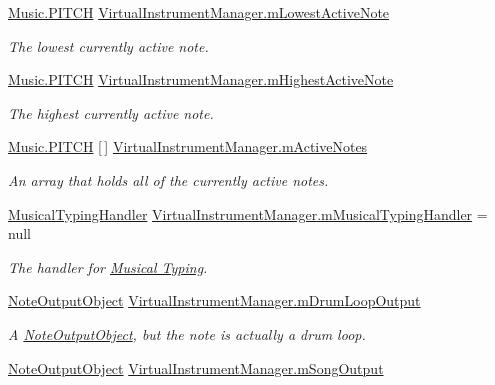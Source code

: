 \begin{DoxyCompactItemize}
\hyperlink{group___music_enums_ga508f69b199ea518f935486c990edac1d}{Music.\+P\+I\+T\+CH} \hyperlink{group___v_i_m_priv_ga5e3a5116e0dabb37e0ea21d73ac1567e}{Virtual\+Instrument\+Manager.\+m\+Lowest\+Active\+Note}
\begin{DoxyCompactList}\small\item\em The lowest currently active note. \end{DoxyCompactList}\item 
\hyperlink{group___music_enums_ga508f69b199ea518f935486c990edac1d}{Music.\+P\+I\+T\+CH} \hyperlink{group___v_i_m_priv_ga73a09a4e4f09c0e5b3871dc9ad6c757e}{Virtual\+Instrument\+Manager.\+m\+Highest\+Active\+Note}
\begin{DoxyCompactList}\small\item\em The highest currently active note. \end{DoxyCompactList}\item 
\hyperlink{group___music_enums_ga508f69b199ea518f935486c990edac1d}{Music.\+P\+I\+T\+CH} \mbox{[}$\,$\mbox{]} \hyperlink{group___v_i_m_priv_ga5cedf9995d59b416412677e6004b659c}{Virtual\+Instrument\+Manager.\+m\+Active\+Notes}
\begin{DoxyCompactList}\small\item\em An array that holds all of the currently active notes. \end{DoxyCompactList}\item 
\hyperlink{class_musical_typing_handler}{Musical\+Typing\+Handler} \hyperlink{group___v_i_m_priv_gad7b95bd21383d11ea0cbf33d79b78e09}{Virtual\+Instrument\+Manager.\+m\+Musical\+Typing\+Handler} = null
\begin{DoxyCompactList}\small\item\em The handler for \hyperlink{class_musical_typing_handler}{Musical Typing}. \end{DoxyCompactList}\item 
\hyperlink{class_note_output_object}{Note\+Output\+Object} \hyperlink{group___v_i_m_priv_ga5f71cb71d240042312dcc13b481b068d}{Virtual\+Instrument\+Manager.\+m\+Drum\+Loop\+Output}
\begin{DoxyCompactList}\small\item\em A \hyperlink{class_note_output_object}{Note\+Output\+Object}, but the note is actually a drum loop. \end{DoxyCompactList}\item 
\hyperlink{class_note_output_object}{Note\+Output\+Object} \hyperlink{group___v_i_m_priv_gaa8d4f5642f5ac4dca4f4178b0052c78d}{Virtual\+Instrument\+Manager.\+m\+Song\+Output}

\end{DoxyCompactItemize}
